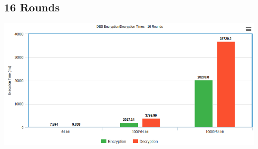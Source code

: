 \documentclass[11pt]{article}
\begin{document}
\subsection{16 Rounds}
\includegraphics[scale=.55]{16RoundGraph}

\setcounter{secnumdepth}{1}
\end{document}
